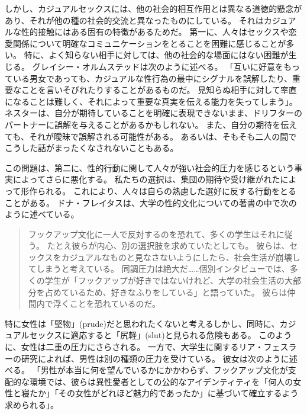 \documentclass[paper=a4,book,openany]{jlreq} \usepackage{mystyle}
\begin{document}
しかし、カジュアルセックスには、他の社会的相互作用とは異なる道徳的懸念があり、それが他の種の社会的交流と異なったものにしている。
それはカジュアルな性的接触にはある固有の特徴があるためだ。
第一に、人々はセックスや恋愛関係について明確なコミュニケーションをとることを困難に感じることが多い。
特に、よく知らない相手に対しては、他の社会的な場面にはない困難が生じる。
グレイシー・オルムステッドは次のように述べる。
「互いに好意をもっている男女であっても、カジュアルな性行為の最中にシグナルを誤解したり、重要なことを言いそびれたりすることがあるものだ。
見知らぬ相手に対して率直になることは難しく、それによって重要な真実を伝える能力を失ってしまう」\citep{olmstead18:_divor_sex_love}。
ネスターは、自分が期待していることを明確に表現できないまま、ドリフターのパートナーに誤解を与えることがあるかもしれない。
また、自分の期待を伝えても、それが曖昧で誤解される可能性がある。
あるいは、そもそも二人の間でこうした話がまったくなされないこともある。

この問題は、第二に、性的行動に関して人々が強い社会的圧力を感じるという事実によってさらに悪化する。
私たちの選択は、集団の期待や受け継がれたによって形作られる。
これにより、人々は自らの熟慮した選好に反する行動をとることがある。
ドナ・フレイタスは、大学の性的文化についての著書の中で次のように述べている。

\begin{quote}
  フックアップ文化に一人で反対するのを恐れて、多くの学生はそれに従う。
たとえ彼らが内心、別の選択肢を求めていたとしても。
彼らは、セックスをカジュアルなものと見なさないようにしたら、社会生活が崩壊してしまうと考えている。
同調圧力は絶大だ……個別インタビューでは、多くの学生が「フックアップが好きではないけれど、大学の社会生活の大部分を占めているため、好きなふりをしている」と語っていた。
彼らは仲間内で浮くことを恐れているのだ。
\citep{freitas13:_time_stop_hook_up}

\end{quote}

特に女性は「堅物」(prude)だと思われたくないと考える{\DDASH}しかし、同時に、カジュアルセックスに適応すると「尻軽」(slut)と見られる危険もある。
このように、女性は二重の圧力にさらされる。
一方で、大学生に関するリア・フェスラーの研究によれば、男性は別の種類の圧力を受けている。
彼女は次のように述べる。
「男性が本当に何を望んでいるかにかかわらず、フックアップ文化が支配的な環境では、彼らは異性愛者としての公的なアイデンティティを「何人の女性と寝たか」「その女性がどれほど魅力的であったか」に基づいて確立するよう求められる」\citep{fessler16:_lot_women_dont}。
\end{document}
